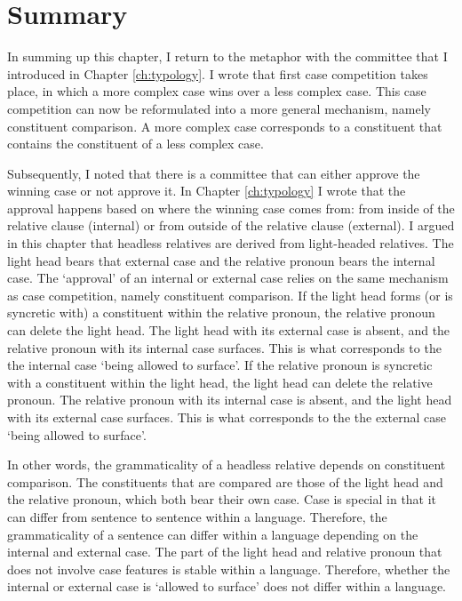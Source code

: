 \section{Summary}

In summing up this chapter, I return to the metaphor with the committee that I introduced in Chapter \ref{ch:typology}. I wrote that first case competition takes place, in which a more complex case wins over a less complex case. This case competition can now be reformulated into a more general mechanism, namely constituent comparison. A more complex case corresponds to a constituent that contains the constituent of a less complex case.

Subsequently, I noted that there is a committee that can either approve the winning case or not approve it. In Chapter \ref{ch:typology} I wrote that the approval happens based on where the winning case comes from: from inside of the relative clause (internal) or from outside of the relative clause (external). I argued in this chapter that headless relatives are derived from light-headed relatives. The light head bears that external case and the relative pronoun bears the internal case. The `approval' of an internal or external case relies on the same mechanism as case competition, namely constituent comparison.
If the light head forms (or is syncretic with) a constituent within the relative pronoun, the relative pronoun can delete the light head. The light head with its external case is absent, and the relative pronoun with its internal case surfaces. This is what corresponds to the the internal case `being allowed to surface'.
If the relative pronoun is syncretic with a constituent within the light head, the light head can delete the relative pronoun. The relative pronoun with its internal case is absent, and the light head with its external case surfaces. This is what corresponds to the the external case `being allowed to surface'.

In other words, the grammaticality of a headless relative depends on constituent comparison. The constituents that are compared are those of the light head and the relative pronoun, which both bear their own case. Case is special in that it can differ from sentence to sentence within a language. Therefore, the grammaticality of a sentence can differ within a language depending on the internal and external case. The part of the light head and relative pronoun that does not involve case features is stable within a language. Therefore, whether the internal or external case is `allowed to surface' does not differ within a language.

